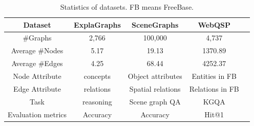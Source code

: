 



\begin{table}[ht]
\centering
\caption{Statistics of datasets. FB means FreeBase.}
\small
\label{tab:dataset_statistics}
\begin{tabular}{|c|c|c|c|c|}
\hline
\textbf{Dataset} & \textbf{ExplaGraphs} & \textbf{SceneGraphs} & \textbf{WebQSP}  \\ \hline
\#Graphs          & 2,766               & 100,000             & 4,737                    \\ \hline
Average \#Nodes   & 5.17                & 19.13               & 1370.89                  \\ \hline
Average \#Edges   & 4.25                & 68.44               & 4252.37                 \\ \hline
Node Attribute    &  concepts & Object attributes    & Entities in FB  \\ \hline
Edge Attribute    &  relations & Spatial relations   & Relations in FB  \\ \hline
Task              &  reasoning & Scene graph QA       & KGQA             \\ \hline
Evaluation metrics & Accuracy            & Accuracy            & Hit@1              \\ \hline
\end{tabular}
\end{table}


